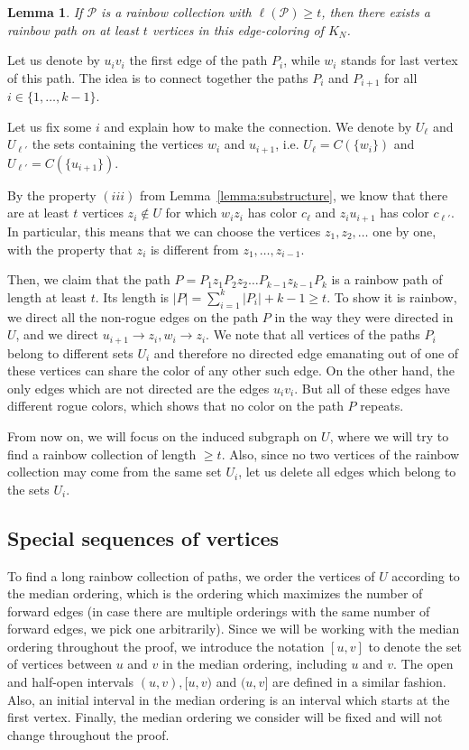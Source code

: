 \documentclass[a4paper,11pt]{article}
\makeatletter
\renewenvironment{proof}[1][\proofname] {\par\pushQED{\qed}\normalfont\topsep6\p@\@plus6\p@\relax\trivlist\item[\hskip\labelsep\bfseries#1\@addpunct{.}]\ignorespaces}{\popQED\endtrivlist\@endpefalse}
\newtheorem{lemma}[theorem]{\bf Lemma}
\theoremstyle{definition}
\def\cP{\mathcal{P}}
\makeatother
\begin{document}
\begin{lemma}\label{lemma:building from directed paths}
If $\cP$ is a rainbow collection with $\ell(\cP)\geq t$, then there exists a rainbow path on at least $t$ vertices in this edge-coloring of $K_N$.
\end{lemma}
\begin{proof}
Let us denote by $u_iv_i$ the first edge of the path $P_i$, while $w_i$ stands for last vertex of this path. The idea is to connect together the paths $P_i$ and $P_{i+1}$ for all $i\in \{1, \dots, k-1\}$. 

Let us fix some $i$ and explain how to make the connection. We denote by $U_\ell$ and $U_{\ell'}$ the sets containing the vertices $w_i$ and $u_{i+1}$, i.e. $U_\ell=C(\{w_i\})$ and $U_{\ell'}=C(\{u_{i+1}\})$.

By the property $(iii)$ from Lemma~\ref{lemma:substructure}, we know that there are at least $t$ vertices $z_i\notin U$ for which $w_iz_i$ has color $c_\ell$ and $z_iu_{i+1}$ has color $c_{\ell'}$. In particular, this means that we can choose the vertices $z_1, z_2, \dots$ one by one, with the property that $z_i$ is different from $z_1, \dots, z_{i-1}$.

Then, we claim that the path $P=P_1z_1P_2z_2\dots P_{k-1}z_{k-1}P_k$ is a rainbow path of length at least $t$. Its length is $|P|=\sum_{i=1}^k |P_i|+k-1\geq t$. To show it is rainbow, we direct all the non-rogue edges on the path $P$ in the way they were directed in $U$, and we direct $u_{i+1}\to z_i, w_i\to z_i$.
We note that all vertices of the paths $P_i$ belong to different sets $U_i$ and therefore no directed edge emanating out of one of these vertices can share the color of any other such edge. On the other hand, the only edges which are not directed are the edges $u_iv_i$. But all of these edges have different rogue colors, which shows that no color on the path $P$ repeats.
\end{proof}

From now on, we will focus on the induced subgraph on $U$, where we will try to find a rainbow collection of length $\geq t$. Also, since no two vertices of the rainbow collection may come from the same set $U_i$, let us delete all edges which belong to the sets $U_i$.

\subsection{Special sequences of vertices}

To find a long rainbow collection of paths, we order the vertices of $U$ according to the median ordering, which is the ordering which maximizes the number of forward edges (in case there are multiple orderings with the same number of forward edges, we pick one arbitrarily). Since we will be working with the median ordering throughout the proof, we introduce the notation $[u, v]$ to denote the set of vertices between $u$ and $v$ in the median ordering, including $u$ and $v$. The open and half-open intervals $(u, v), [u, v)$ and $(u, v]$ are defined in a similar fashion. Also, an initial interval in the median ordering is an interval which starts at the first vertex. Finally, the median ordering we consider will be fixed and will not change throughout the proof.
\end{document}
